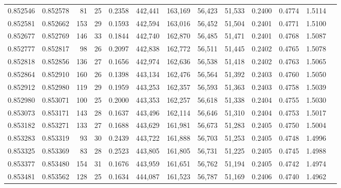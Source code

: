\begin{tabular}{rrrrrrrrrrrrr}
0.852546 & 0.852578 &    81 &  25 &                                     0.2358 & 442,441 & 163,169 &  56,423 &  51,533 & 0.2400 & 0.4774 & 1.5114 \\
0.852581 & 0.852662 &   153 &  29 &                                     0.1593 & 442,594 & 163,016 &  56,452 &  51,504 & 0.2401 & 0.4771 & 1.5100 \\
0.852677 & 0.852769 &   146 &  33 &                                     0.1844 & 442,740 & 162,870 &  56,485 &  51,471 & 0.2401 & 0.4768 & 1.5087 \\
0.852777 & 0.852817 &    98 &  26 &                                     0.2097 & 442,838 & 162,772 &  56,511 &  51,445 & 0.2402 & 0.4765 & 1.5078 \\
0.852818 & 0.852856 &   136 &  27 &                                     0.1656 & 442,974 & 162,636 &  56,538 &  51,418 & 0.2402 & 0.4763 & 1.5065 \\
0.852864 & 0.852910 &   160 &  26 &                                     0.1398 & 443,134 & 162,476 &  56,564 &  51,392 & 0.2403 & 0.4760 & 1.5050 \\
0.852912 & 0.852980 &   119 &  29 &                                     0.1959 & 443,253 & 162,357 &  56,593 &  51,363 & 0.2403 & 0.4758 & 1.5039 \\
0.852980 & 0.853071 &   100 &  25 &                                     0.2000 & 443,353 & 162,257 &  56,618 &  51,338 & 0.2404 & 0.4755 & 1.5030 \\
0.853073 & 0.853171 &   143 &  28 &                                     0.1637 & 443,496 & 162,114 &  56,646 &  51,310 & 0.2404 & 0.4753 & 1.5017 \\
0.853182 & 0.853271 &   133 &  27 &                                     0.1688 & 443,629 & 161,981 &  56,673 &  51,283 & 0.2405 & 0.4750 & 1.5004 \\
0.853283 & 0.853319 &    93 &  30 &                                     0.2439 & 443,722 & 161,888 &  56,703 &  51,253 & 0.2405 & 0.4748 & 1.4996 \\
0.853325 & 0.853369 &    83 &  28 &                                     0.2523 & 443,805 & 161,805 &  56,731 &  51,225 & 0.2405 & 0.4745 & 1.4988 \\
0.853377 & 0.853480 &   154 &  31 &                                     0.1676 & 443,959 & 161,651 &  56,762 &  51,194 & 0.2405 & 0.4742 & 1.4974 \\
0.853481 & 0.853562 &   128 &  25 &                                     0.1634 & 444,087 & 161,523 &  56,787 &  51,169 & 0.2406 & 0.4740 & 1.4962 \\

\end{tabular}
